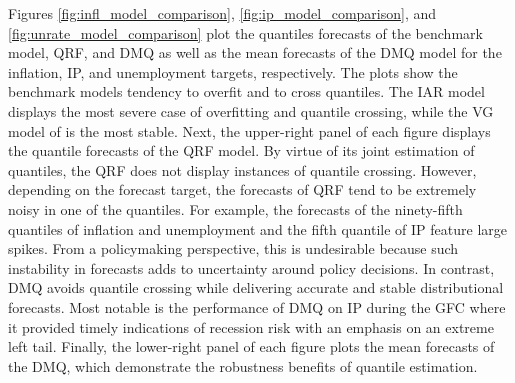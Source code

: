 \documentclass[12pt]{article}
\newcommand{\resultsdate}{2026-02-05}
\begin{document}
\begin{table}[htbp]
  \centering
  \resizebox{\textwidth}{!}{
  
  }
  \caption{$R^2$ table}
  \label{tab: baseline r2 table}
\end{table}

Figures \ref{fig:infl_model_comparison}, \ref{fig:ip_model_comparison}, and \ref{fig:unrate_model_comparison} plot the quantiles forecasts of the benchmark model, QRF, and DMQ as well as the mean forecasts of the DMQ model for the inflation, IP, and unemployment targets, respectively. The plots show the benchmark models tendency to overfit and to cross quantiles. The IAR model displays the most severe case of overfitting and quantile crossing, while the VG model of \cite{adrianVulnerableGrowth2019} is the most stable. Next, the upper-right panel of each figure displays the quantile forecasts of the QRF model. By virtue of its joint estimation of quantiles, the QRF does not display instances of quantile crossing. However, depending on the forecast target, the forecasts of QRF tend to be extremely noisy in one of the quantiles. For example, the forecasts of the ninety-fifth quantiles of inflation and unemployment and the fifth quantile of IP feature large spikes. From a policymaking perspective, this is undesirable because such instability in forecasts adds to uncertainty around policy decisions. In contrast, DMQ avoids quantile crossing while delivering accurate and stable distributional forecasts. Most notable is the performance of DMQ on IP during the GFC where it provided timely indications of recession risk with an emphasis on an extreme left tail. Finally, the lower-right panel of each figure plots the mean forecasts of the DMQ, which demonstrate the robustness benefits of quantile estimation. 
\end{document}
